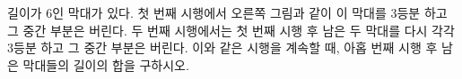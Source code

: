 \noindent\begin{minipage}[t]{0.58\linewidth}\vspace{0pt}\raggedright 길이가 $6$인 막대가 있다. 첫 번째 시행에서 오른쪽 그림과 같이 이 막대를 3등분 하고 그 중간 부분은 버린다. 두 번째 시행에서는 첫 번째 시행 후 남은 두 막대를 다시 각각 3등분 하고 그 중간 부분은 버린다. 이와 같은 시행을 계속할 때, 아홉 번째 시행 후 남은 막대들의 길이의 합을 구하시오.\end{minipage}\hfill\begin{minipage}[t]{0.4\linewidth}\vspace{0pt}\centering \resizebox{\ifdim\width>\linewidth\linewidth\else\width\fi}{!}{}\end{minipage}\par
